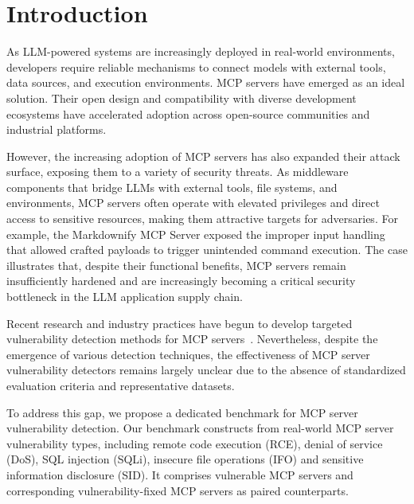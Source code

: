 \section{Introduction}



As LLM-powered systems are increasingly deployed in real-world environments, developers require reliable mechanisms to connect models with external tools, data sources, and execution environments. MCP servers have emerged as an ideal solution. Their open design and compatibility with diverse development ecosystems have accelerated adoption across open-source communities and industrial platforms.

However, the increasing adoption of MCP servers has also expanded their attack surface, exposing them to a variety of security threats. As middleware components that bridge LLMs with external tools, file systems, and environments, MCP servers often operate with elevated privileges and direct access to sensitive resources, making them attractive targets for adversaries. For example, the Markdownify MCP Server exposed the improper input handling~\cite{cve5276} that allowed crafted payloads to trigger unintended command execution. The case illustrates that, despite their functional benefits, MCP servers remain insufficiently hardened and are increasingly becoming a critical security bottleneck in the LLM application supply chain.


Recent research and industry practices have begun to develop targeted vulnerability detection methods for MCP servers~\cite{radosevich2025mcp, wang2025mcpguard, hou2025model, hou2026smcp, coleman2025behavioral}. Nevertheless, despite the emergence of various detection techniques, the effectiveness of MCP server vulnerability detectors remains largely unclear due to the absence of standardized evaluation criteria and representative datasets. 

To address this gap, we propose a dedicated benchmark for MCP server vulnerability detection. Our benchmark constructs from real-world MCP server vulnerability types, including remote code execution (RCE), denial of service (DoS), SQL injection (SQLi), insecure file operations (IFO) and sensitive information disclosure (SID). It comprises  vulnerable MCP servers and  corresponding vulnerability-fixed MCP servers as paired counterparts.

